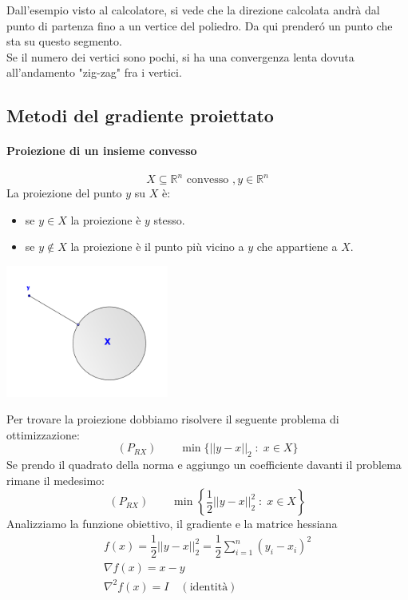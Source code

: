 \begin{notes}
  Dall'esempio visto al calcolatore, si vede che la direzione
  calcolata andr\`a dal punto di partenza fino a un vertice del
  poliedro. Da qui
  prender\'o un punto che sta su questo segmento. \\
  Se il numero dei vertici sono pochi, si ha una convergenza lenta
  dovuta all'andamento "zig-zag" fra i vertici.
\end{notes}


\subsection{Metodi del gradiente proiettato}
\paragraph{Proiezione di un insieme convesso}
$$ X \subseteq \mathbb{R}^{n} \text{ convesso }, y \in \mathbb{R}^{n}$$
La proiezione del punto $y$ su $X$ \`e:
\begin{itemize}
\item se $y \in X$ la proiezione \`e $y$ stesso.
\item se $y \notin X$ la proiezione \`e il punto pi\`u vicino a $y$
  che appartiene a $X$.
\end{itemize}

\begin{center}
  \includegraphics[width=0.4\textwidth]{imgs/proiezione.png}
\end{center}

Per trovare la proiezione dobbiamo risolvere il seguente problema di ottimizzazione:
$$(P_{RX}) \qquad \min \{ || y - x ||_{2} \; : \; x \in X \}$$
Se prendo il quadrato della norma e aggiungo un coefficiente davanti
il problema rimane il medesimo:
$$(P_{RX}) \qquad \min \left\{ \dfrac{1}{2}|| y - x ||_{2}^{2} \; : \; x \in X \right\}  $$
Analizziamo la funzione obiettivo, il gradiente e la matrice hessiana
$$ 
\begin{array}{l}
  f(x) = \dfrac{1}{2} || y - x||_{2}^{2} =
  \dfrac{1}{2} \displaystyle \sum_{i=1}^{n} (y_i - x_i)^{2} \\
  \nabla f(x) = x - y \\
  \nabla^{2}f(x) = I \quad (\text{identit\`a})  
\end{array}
$$


